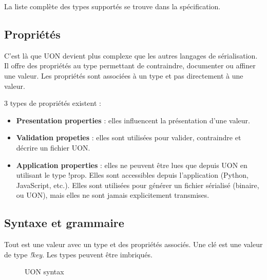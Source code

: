 \documentclass[
    iict, %
    il, %
]{heig-tb}
\begin{document}
La liste complète des types supportés se trouve dans la spécification.

\subsection{Propriétés}\label{properties}
C'est là que UON devient plus complexe que les autres langages de sérialisation.
Il offre des propriétés au type permettant de contraindre, documenter ou affiner une valeur. Les propriétés sont associées à un type et pas directement à une valeur.

3 types de propriétés existent :
\begin{itemize}
    \item \textbf{Presentation properties} : elles influencent la présentation d'une valeur.
    \item \textbf{Validation propeties} : elles sont utilisées pour valider, contraindre et décrire un fichier UON.
    \item \textbf{Application properties} : elles ne peuvent être lues que depuis UON en utilisant le type !prop. Elles sont accessibles depuis l'application (Python, JavaScript, etc.). Elles sont utilisées pour générer un fichier sérialisé (binaire, ou UON), mais elles ne sont jamais explicitement transmises.
\end{itemize}

\subsection{Syntaxe et grammaire}

Tout est une valeur avec un type et des propriétés associés. Une clé est une valeur de type \emph{!key}. Les types peuvent être imbriqués.

\begin{figure}[H]
    \begin{center}
    \end{center}
    \caption[Règle de syntaxe en UON]{\label{syntax} UON syntax}
\end{figure}
\end{document}
